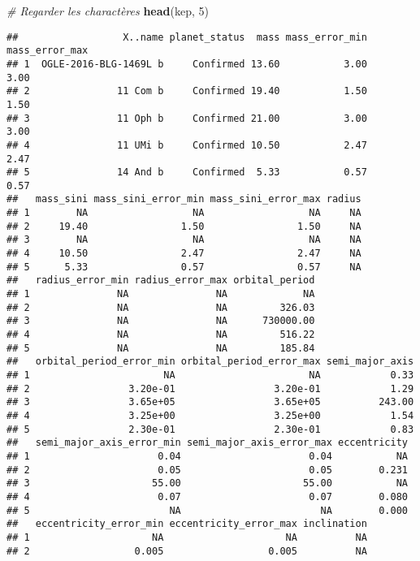\documentclass[]{article}
\newenvironment{Shaded}{\begin{snugshade}}{\end{snugshade}}
\newcommand{\KeywordTok}[1]{\textcolor[rgb]{0.13,0.29,0.53}{\textbf{{#1}}}}
\newcommand{\DecValTok}[1]{\textcolor[rgb]{0.00,0.00,0.81}{{#1}}}
\newcommand{\CommentTok}[1]{\textcolor[rgb]{0.56,0.35,0.01}{\textit{{#1}}}}
\newcommand{\NormalTok}[1]{{#1}}
\begin{document}
\begin{Shaded}
\begin{Highlighting}[]
\CommentTok{# Regarder les charactères}
\KeywordTok{head}\NormalTok{(kep, }\DecValTok{5}\NormalTok{)}
\end{Highlighting}
\end{Shaded}

\begin{verbatim}
##                  X..name planet_status  mass mass_error_min mass_error_max
## 1  OGLE-2016-BLG-1469L b     Confirmed 13.60           3.00           3.00
## 2               11 Com b     Confirmed 19.40           1.50           1.50
## 3               11 Oph b     Confirmed 21.00           3.00           3.00
## 4               11 UMi b     Confirmed 10.50           2.47           2.47
## 5               14 And b     Confirmed  5.33           0.57           0.57
##   mass_sini mass_sini_error_min mass_sini_error_max radius
## 1        NA                  NA                  NA     NA
## 2     19.40                1.50                1.50     NA
## 3        NA                  NA                  NA     NA
## 4     10.50                2.47                2.47     NA
## 5      5.33                0.57                0.57     NA
##   radius_error_min radius_error_max orbital_period
## 1               NA               NA             NA
## 2               NA               NA         326.03
## 3               NA               NA      730000.00
## 4               NA               NA         516.22
## 5               NA               NA         185.84
##   orbital_period_error_min orbital_period_error_max semi_major_axis
## 1                       NA                       NA            0.33
## 2                 3.20e-01                 3.20e-01            1.29
## 3                 3.65e+05                 3.65e+05          243.00
## 4                 3.25e+00                 3.25e+00            1.54
## 5                 2.30e-01                 2.30e-01            0.83
##   semi_major_axis_error_min semi_major_axis_error_max eccentricity
## 1                      0.04                      0.04           NA
## 2                      0.05                      0.05        0.231
## 3                     55.00                     55.00           NA
## 4                      0.07                      0.07        0.080
## 5                        NA                        NA        0.000
##   eccentricity_error_min eccentricity_error_max inclination
## 1                     NA                     NA          NA
## 2                  0.005                  0.005          NA

\end{verbatim}
\end{document}
